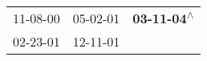 \begin{supertabular}{lll}
 11-08-00\textsuperscript{} &  05-02-01\textsuperscript{} &  \textbf{03-11-04\textsuperscript{$\wedge$}} \\
 02-23-01\textsuperscript{} &  12-11-01\textsuperscript{} &                                              \\
\end{supertabular}
